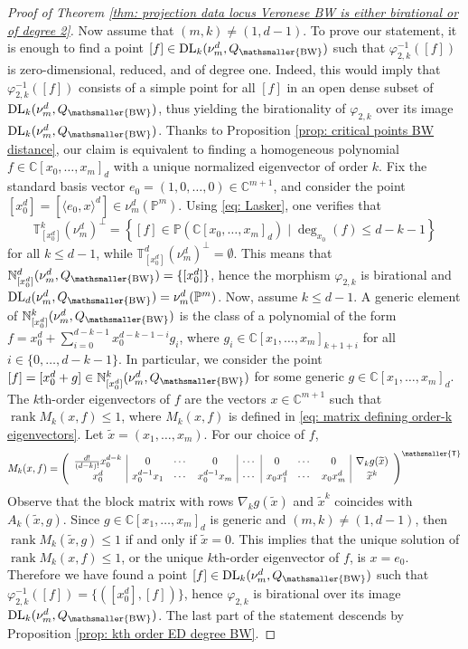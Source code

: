 \documentclass[11pt,reqno]{amsart}
\numberwithin{equation}{section}
\theoremstyle{plain}
\numberwithin{theorem}{section}
\theoremstyle{definition}
\newcommand{\N}{\mathbb{N}}
\renewcommand{\P}{\mathbb{P}}
\newcommand{\C}{\mathbb{C}}
\newcommand{\T}{\mathbb{T}}
\newcommand{\DL}{\operatorname{DL}}
\newcommand{\rank}{\operatorname{rank}}
\newcommand{\mT}{\mathsmaller{\mathsf{T}}}
\newcommand{\mBW}{\mathsmaller{\mathrm{BW}}}
\begin{document}
\begin{proof}[Proof of Theorem \ref{thm: projection data locus Veronese BW is either birational or of degree 2}]
Now assume that $(m,k)\neq(1,d-1)$. To prove our statement, it is enough to find a point $[f]\in\DL_k(\nu_m^d,Q_\mBW)$ such that $\varphi_{2,k}^{-1}([f])$ is zero-dimensional, reduced, and of degree one. Indeed, this would imply that $\varphi_{2,k}^{-1}([f])$ consists of a simple point for all $[f]$ in an open dense subset of $\DL_k(\nu_m^d,Q_\mBW)$, thus yielding the birationality of $\varphi_{2,k}$ over its image $\DL_k(\nu_m^d,Q_\mBW)$. Thanks to Proposition \ref{prop: critical points BW distance}, our claim is equivalent to finding a homogeneous polynomial $f\in\C[x_0,\dots,x_m]_d$ with a unique normalized eigenvector of order $k$.
Fix the standard basis vector $e_0=(1,0,\dots,0)\in\C^{m+1}$, and consider the point $[x_0^d]=[\langle e_0,x\rangle^d]\in \nu_m^d(\P^m)$. Using \eqref{eq: Lasker}, one verifies that
\[
\T_{[x_0^d]}^k(\nu_m^d)^\perp = \left\{[f]\in\P(\C[x_0,\dots,x_m]_d) \mid \deg_{x_0}(f)\le d-k-1\right\}
\]
for all $k\le d-1$, while $\T_{[x_0^d]}^d(\nu_m^d)^\perp = \emptyset$. This means that $\N_{[x_0^d]}^d(\nu_m^d,Q_\mBW)=\{[x_0^d]\}$, hence the morphism $\varphi_{2,k}$ is birational and $\DL_d(\nu_m^d,Q_\mBW)=\nu_m^d(\P^m)$. Now, assume $k\le d-1$. A generic element of $\N_{[x_0^d]}^k(\nu_m^d,Q_\mBW)$ is the class of a polynomial of the form $f=x_0^d+\sum_{i=0}^{d-k-1}x_0^{d-k-1-i}g_i$, where $g_i\in\C[x_1,\dots,x_m]_{k+1+i}$ for all $i\in\{0,\dots,d-k-1\}$. In particular, we consider the point $[f]=[x_0^d+g]\in \N_{[x_0^d]}^k(\nu_m^d,Q_\mBW)$ for some generic $g\in\C[x_1,\dots,x_m]_d$. The $k$th-order eigenvectors of $f$ are the vectors $x\in\C^{m+1}$ such that $\rank M_k(x,f)\le 1$, where $M_k(x,f)$ is defined in \eqref{eq: matrix defining order-k eigenvectors}. Let $\widetilde{x}=(x_1,\dots,x_m)$. For our choice of $f$,
\[
M_k(x,f) =
\left(
\begin{array}{c|ccc|c|ccc|c}
    \frac{d!}{(d-k)!}x_0^{d-k} & 0 & \cdots & 0 & \cdots & 0 & \cdots & 0 & \nabla_kg(\widetilde{x}) \\
    x_0^d & x_0^{d-1}x_1 & \cdots & x_0^{d-1}x_m & \cdots & x_0x_1^d & \cdots & x_0x_m^d & \widetilde{x}^k
\end{array}
\right)^\mT
\]
Observe that the block matrix with rows $\nabla_kg(\widetilde{x})$ and $\widetilde{x}^k$ coincides with $A_k(\widetilde{x},g)$. Since $g\in\C[x_1,\dots,x_m]_d$ is generic and $(m,k)\neq(1,d-1)$, then $\rank M_k(\widetilde{x},g)\le 1$ if and only if $\widetilde{x}=0$. This implies that the unique solution of $\rank M_k(x,f)\le 1$, or the unique $k$th-order eigenvector of $f$, is $x=e_0$. Therefore we have found a point $[f]\in\DL_k(\nu_m^d,Q_\mBW)$ such that $\varphi_{2,k}^{-1}([f])=\{([x_0^d],[f])\}$, hence $\varphi_{2,k}$ is birational over its image $\DL_k(\nu_m^d,Q_\mBW)$. The last part of the statement descends by Proposition \ref{prop: kth order ED degree BW}.


\end{proof}
\end{document}
